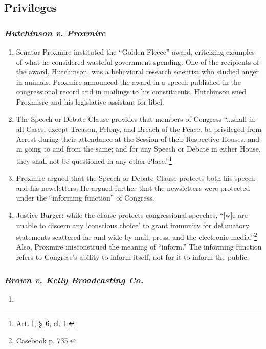 \subsection{Privileges}

\subsubsection{\emph{Hutchinson v. Proxmire}}

\begin{enumerate}
    \item Senator Proxmire instituted the ``Golden Fleece'' award, critcizing 
    examples of what he considered wasteful government spending. One of the 
    recipients of the award, Hutchinson, was a behavioral research scientist 
    who studied anger in animals. Proxmire announced the award in a speech 
    published in the congressional record and in mailings to his constituents. 
    Hutchinson sued Proxmisre and his legislative assistant for libel.
    \item The Speech or Debate Clause provides that members of Congress 
    ``...shall in all Cases, except Treason, Felony, and Breach of the Peace, 
    be privileged from Arrest during their attendance at the Session of their 
    Respective Houses, and in going to and from the same; and for any Speech 
    or Debate in either House, they shall not be questioned in any other 
    Place.''\footnote{Art. I, \S\ 6, cl. 1.}
    \item Proxmire argued that the Speech or Debate Clause protects both his 
    speech and his newsletters. He argued further that the newsletters were 
    protected under the ``informing function'' of Congress.
    \item Justice Burger: while the clause protects congressional speeches, 
    ``[w]e are unable to discern any `conscious choice' to grant immunity for 
    defamatory statements scattered far and wide by mail, press, and the 
    electronic media.''\footnote{Casebook p. 735.} Also, Proxmire misconstrued 
    the meaning of ``inform.'' The informing function refers to Congress's 
    ability to inform itself, not for it to inform the public.
\end{enumerate}

\subsubsection{\emph{Brown v. Kelly Broadcasting Co.}}

\begin{enumerate}
    \item %
\end{enumerate}
